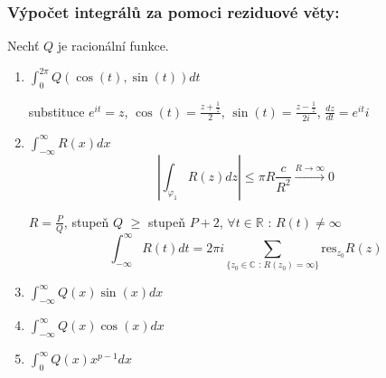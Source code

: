 \subsubsection*{Výpočet integrálů za pomoci reziduové věty:}

Nechť $Q$ je racionální funkce.

\begin{enumerate}
\item $\int_0^{2\pi} Q(\cos(t), \sin(t))dt$

substituce $e^{it} = z$, $\cos(t) = \frac{z + \frac{1}{z}}{2}$, $\sin(t) = \frac{z-\frac{1}{z}}{2i}$, $\frac{dz}{dt} = e^{it}i$

\item $\int_{-\infty}^\infty R(x) dx$
$$\left| \int_{\varphi_1} R(z) dz \right| \leq \pi R \frac{c}{R^2} \overset{R \to \infty}{\to} 0$$

$R = \frac{P}{Q}$, stupeň $Q$ $\geq$ stupeň $P + 2$, $\forall t \in \mathbb{R} \textrm{ : } R(t) \neq \infty$
$$\int_{-\infty}^\infty R(t) dt = 2 \pi i \sum_{ \{ z_0 \in \mathbb{C} \textrm{ : } R(z_0) = \infty \} } \textrm{res}_{z_0} R(z)$$

\item $\int_{-\infty}^{\infty} Q(x) \sin(x) dx$
\item $\int_{-\infty}^{\infty} Q(x) \cos(x) dx$
\item $\int_0^{\infty} Q(x) x^{p-1} dx$
\end{enumerate}